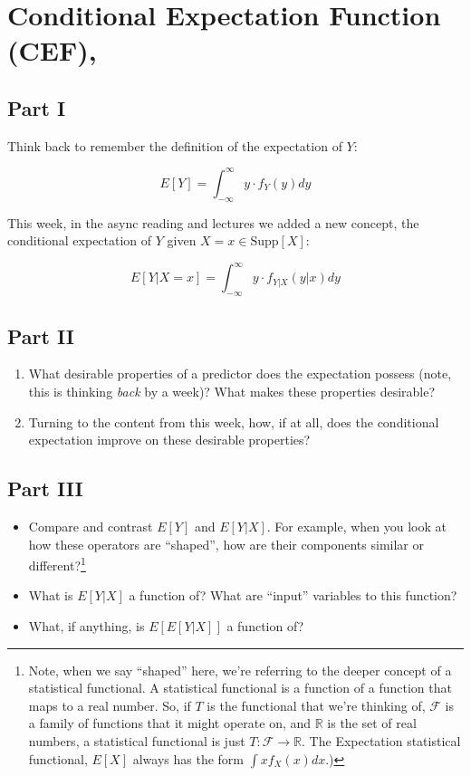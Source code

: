 \documentclass[
]{book}
\providecommand{\tightlist}{%
  \setlength{\itemsep}{0pt}\setlength{\parskip}{0pt}}
\theoremstyle{definition}
\theoremstyle{definition}
\theoremstyle{definition}
\theoremstyle{definition}
\theoremstyle{remark}
\begin{document}
\section{Conditional Expectation Function (CEF),}\label{conditional-expectation-function-cef}

\subsection{Part I}\label{part-i}

Think back to remember the definition of the expectation of \(Y\):

\[
  E[Y] = \int_{-\infty}^\infty y \cdot f_{Y}(y) dy
\]

This week, in the async reading and lectures we added a new concept, the conditional expectation of \(Y\) given \(X=x \in \text{Supp}[X]\):

\[
  E[Y|X=x] =  \int_{-\infty}^\infty y \cdot f_{Y|X}(y|x) dy
\]

\subsection{Part II}\label{part-ii}

\begin{enumerate}
\def\labelenumi{\arabic{enumi}.}
\tightlist
\item
  What desirable properties of a predictor does the expectation possess (note, this is thinking \emph{back} by a week)? What makes these properties desirable?
\item
  Turning to the content from this week, how, if at all, does the conditional expectation improve on these desirable properties?
\end{enumerate}

\subsection{Part III}\label{part-iii}

\begin{itemize}
\item
  Compare and contrast \(E[Y]\) and \(E[Y|X]\). For example, when you look at how these operators are ``shaped'', how are their components similar or different?\footnote{Note, when we say ``shaped'' here, we're referring to the deeper concept of a statistical functional. A statistical functional is a function of a function that maps to a real number. So, if \(T\) is the functional that we're thinking of, \(\mathcal{F}\) is a family of functions that it might operate on, and \(\mathbb{R}\) is the set of real numbers, a statistical functional is just \(T: \mathcal{F} \rightarrow \mathbb{R}\). The Expectation statistical functional, \(E[X]\) always has the form \(\int x f_{X}(x)dx\).)}
\item
  What is \(E[Y|X]\) a function of? What are ``input'' variables to this function?
\item
  What, if anything, is \(E[E[Y|X]]\) a function of?
\end{itemize}
\end{document}
